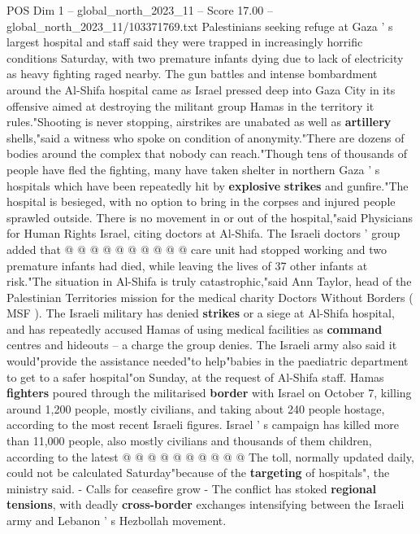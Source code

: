 \begin{textsample}{POS Dim 1 – global\_north\_2023\_11 – Score 17.00 – global\_north\_2023\_11/103371769.txt}  \label{ex:f1_pos_354}
Palestinians seeking refuge at Gaza ' s largest hospital and staff said they were trapped in increasingly horrific conditions Saturday, with two premature infants dying due to lack of electricity as heavy fighting raged nearby.
The gun battles and intense bombardment around the Al-Shifa hospital came as Israel pressed deep into Gaza City in its offensive aimed at destroying the militant group Hamas in the territory it rules."Shooting is never stopping, airstrikes are unabated as well as \textbf{artillery} shells,"said a witness who spoke on condition of anonymity."There are dozens of bodies around the complex that nobody can reach."Though tens of thousands of people have fled the fighting, many have taken shelter in northern Gaza ' s hospitals which have been repeatedly hit by \textbf{explosive} \textbf{strikes} and gunfire."The hospital is besieged, with no option to bring in the corpses and injured people sprawled outside.
There is no movement in or out of the hospital,"said Physicians for Human Rights Israel, citing doctors at Al-Shifa.
The Israeli doctors ' group added that @ @ @ @ @ @ @ @ @ @ care unit had stopped working and two premature infants had died, while leaving the lives of 37 other infants at risk."The situation in Al-Shifa is truly catastrophic,"said Ann Taylor, head of the Palestinian Territories mission for the medical charity Doctors Without Borders ( MSF ).
The Israeli military has denied \textbf{strikes} or a siege at Al-Shifa hospital, and has repeatedly accused Hamas of using medical facilities as \textbf{command} centres and hideouts -- a charge the group denies.
The Israeli army also said it would"provide the assistance needed"to help"babies in the paediatric department to get to a safer hospital"on Sunday, at the request of Al-Shifa staff.
Hamas \textbf{fighters} poured through the militarised \textbf{border} with Israel on October 7, killing around 1,200 people, mostly civilians, and taking about 240 people hostage, according to the most recent Israeli figures.
Israel ' s campaign has killed more than 11,000 people, also mostly civilians and thousands of them children, according to the latest @ @ @ @ @ @ @ @ @ @ The toll, normally updated daily, could not be calculated Saturday"because of the \textbf{targeting} of hospitals", the ministry said. - Calls for ceasefire grow - The conflict has stoked \textbf{regional} \textbf{tensions}, with deadly \textbf{cross-border} exchanges intensifying between the Israeli army and Lebanon ' s Hezbollah movement.

\end{textsample}
